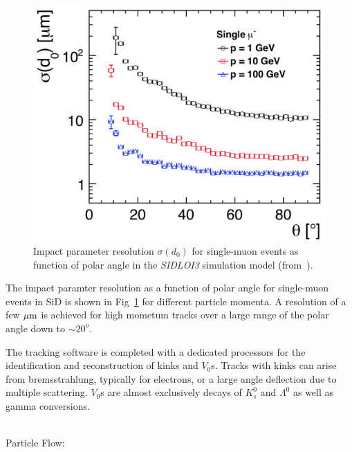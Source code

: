 \begin{figure}
\begin{center}
\includegraphics[width=0.85\hsize]{chapters/figures/SiD_D0_resolution.png}
\end{center}
\caption{Impact parameter resolution $\sigma(d_0)$ for single-muon events as function of polar angle
  in the \emph{SIDLOI3} simulation model (from~\cite{Behnke:2013lya}).} 
\label{fig:sid_d0_res}
\end{figure}

The impact paramter resolution as a function of polar angle for single-muon events in SiD is shown in Fig~\ref{fig:sid_d0_res} for
different particle momenta. A resolution of a few $\mu\rm{m}$ is achieved for high mometum tracks over a large range of the polar
angle down to $\sim 20^{o}$.


The tracking software is completed with a dedicated processors for the identification and reconstruction of kinks and $V_0$s.
Tracks with kinks can arise from bremsstrahlung, typically for electrons, or a large angle deflection due to multiple scattering.
$V_0$s are almost exclusively decays of $K^0_s$ and $\Lambda^0$ as well as gamma conversions.

~~~\\
Particle Flow: \\

